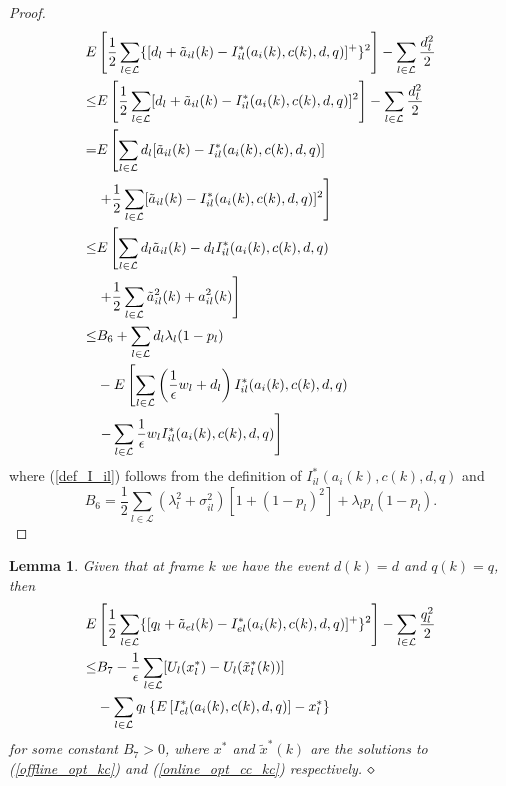 \documentclass[conference]{IEEEtran}
\newtheorem{lemma}{Lemma}
\begin{document}
\begin{proof}
\begin{align}
 	E & \left[ \frac{1}{2} \sum_{l \in \mathcal{L}} \{ [ d_l + \tilde{a}_{il}(k) - I_{il}^*(a_i(k),c(k),d,q) ]^+ \}^2 \right] - \sum_{l \in \mathcal{L}} \frac{d_l^2}{2} \notag \\
	\leq & E \left[ \frac{1}{2} \sum_{l \in \mathcal{L}} [ d_l + \tilde{a}_{il}(k) - I_{il}^*(a_i(k),c(k),d,q) ]^2 \right] - \sum_{l \in \mathcal{L}} \frac{d_l^2}{2} \notag \\
 	= & E \left[ \sum_{l \in \mathcal{L}} d_l [ \tilde{a}_{il}(k) - I_{il}^*(a_i(k),c(k),d,q) ] \right. \notag \\
 	& \left. + \frac{1}{2} \sum_{l \in \mathcal{L}} [ \tilde{a}_{il}(k) - I_{il}^*(a_i(k),c(k),d,q) ]^2 \right] \notag \\
 	\leq & E \left[ \sum_{l \in \mathcal{L}} d_l \tilde{a}_{il}(k) - d_l I_{il}^*(a_i(k),c(k),d,q) \right. \notag \\
 	& \left. + \frac{1}{2} \sum_{l \in \mathcal{L}} \tilde{a}_{il}^2(k) + a_{il}^2(k) \right] \label{def_I_il} \\
 	\leq & B_6 + \sum_{l \in \mathcal{L}} d_l \lambda_l (1-p_l) \notag \\
 	& - E \left[ \sum_{l \in \mathcal{L}} \left( \frac{1}{\epsilon}w_l + d_l \right) I_{il}^*(a_i(k),c(k),d,q) \right. \notag \\
 	& \left. - \sum_{l \in \mathcal{L}} \frac{1}{\epsilon}w_l I_{il}^*(a_i(k),c(k),d,q) \right] \notag
\end{align}
where (\ref{def_I_il}) follows from the definition of $I_{il}^*(a_i(k),c(k),d,q)$ and
\begin{equation*}
	B_6 = \frac{1}{2} \sum_{l \in \mathcal{L}} ( \lambda_l^2 + \sigma_{il}^2 ) [ 1+(1-p_l)^2 ] + \lambda_l p_l (1-p_l).
\end{equation*}
\end{proof}

\begin{lemma}
\label{bound_q_kc}
Given that at frame $k$ we have the event $d(k)=d$ and $q(k)=q$, then
\begin{align*}
	E & \left[ \frac{1}{2} \sum_{l \in \mathcal{L}} \{ [ q_l + \tilde{a}_{el}(k) - I_{el}^*(a_i(k),c(k),d,q) ]^+ \}^2 \right] - \sum_{l \in \mathcal{L}} \frac{q_l^2}{2} \\
 	\leq & B_7 - \frac{1}{\epsilon} \sum_{l \in \mathcal{L}} [ U_l(x_l^*) - U_l(\tilde{x}_l^*(k)) ] \notag \\
 	& - \sum_{l \in \mathcal{L}} q_l \left\{ E \left[ I_{el}^*(a_i(k),c(k),d,q) \right] - x_l^* \right\} \notag
\end{align*}
for some constant $B_7>0$, where $x^*$ and $\tilde{x}^*(k)$ are the solutions to (\ref{offline_opt_kc}) and (\ref{online_opt_cc_kc}) respectively.
$\hfill \diamond$
\end{lemma}
\end{document}
